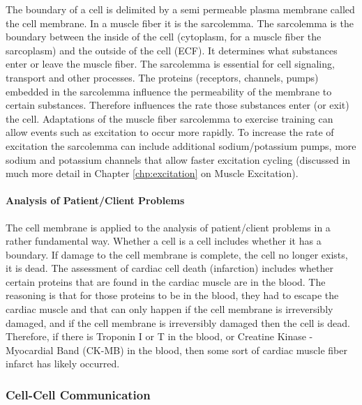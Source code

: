 The boundary of a cell is delimited by a semi permeable plasma membrane called the cell membrane. In a muscle fiber it is the sarcolemma. The sarcolemma is the boundary between the inside of the cell (cytoplasm, for a muscle fiber the sarcoplasm) and the outside of the cell (ECF). It determines what substances enter or leave the muscle fiber. The sarcolemma is essential for cell signaling, transport and other processes. The proteins (receptors, channels, pumps) embedded in the sarcolemma influence the permeability of the membrane to certain substances. Therefore influences the rate those substances enter (or exit) the cell. Adaptations of the muscle fiber sarcolemma to exercise training can allow events such as excitation to occur more rapidly. To increase the rate of excitation the sarcolemma can include additional sodium/potassium pumps, more sodium and potassium channels that allow faster excitation cycling (discussed in much more detail in Chapter \ref{chp:excitation} on Muscle Excitation).

\paragraph{Analysis of Patient/Client Problems}
The cell membrane is applied to the analysis of patient/client problems in a rather fundamental way. Whether a cell is a cell includes whether it has a boundary. If damage to the cell membrane is complete, the cell no longer exists, it is dead. The assessment of cardiac cell death (infarction) includes whether certain proteins that are found in the cardiac muscle are in the blood. The reasoning is that for those proteins to be in the blood, they had to escape the cardiac muscle and that can only happen if the cell membrane is irreversibly damaged, and if the cell membrane is irreversibly damaged then the cell is dead. Therefore, if there is Troponin I or T in the blood, or Creatine Kinase - Myocardial Band (CK-MB) in the blood, then some sort of cardiac muscle fiber infarct has likely occurred.

\subsubsection{Cell-Cell Communication}


